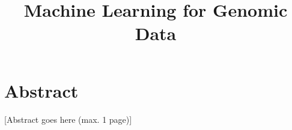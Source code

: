 \documentclass[a4paper, twoside, 12pt]{article}
\title{Machine Learning for Genomic Data}
\begin{document}




\clearpage
\thispagestyle{empty}
\section*{Abstract}

[Abstract goes here (max. 1 page)]



\clearpage
{}
\tableofcontents










% 







\appendix
\renewcommand*{\thesection}{\Alph{section}}\textbf{}








\clearpage
\renewcommand*{\thesection}{}\textbf{}

\listoffigures
\clearpage
\listoftables
\clearpage



\end{document}
